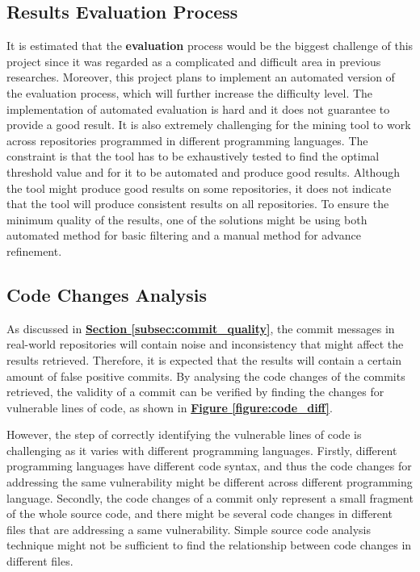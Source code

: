 \documentclass[12pt, a4paper]{report}
\begin{document}
\subsection{Results Evaluation Process}
It is estimated that the \textbf{evaluation} process would be the biggest challenge of this project
since it was regarded as a complicated and difficult area in previous researches. Moreover, this
project plans to implement an automated version of the evaluation process, which will further
increase the difficulty level. The implementation of automated evaluation is hard and it does not
guarantee to provide a good result. It is also extremely challenging for the mining tool to work
across repositories programmed in different programming languages. The constraint is that the tool
has to be exhaustively tested to find the optimal threshold value and for it to be automated and
produce good results. Although the tool might produce good results on some repositories, it does not
indicate that the tool will produce consistent results on all repositories. To ensure the minimum
quality of the results, one of the solutions might be using both automated method for basic
filtering and a manual method for advance refinement.

\subsection{Code Changes Analysis}
As discussed in \hyperref[subsec:commit_quality]{\textbf{Section \ref*{subsec:commit_quality}}}, the
commit messages in real-world repositories will contain noise and inconsistency that might affect
the results retrieved. Therefore, it is expected that the results will contain a certain amount of
false positive commits. By analysing the code changes of the commits retrieved, the validity of a
commit can be verified by finding the changes for vulnerable lines of code, as shown in
\hyperref[figure:code_diff]{\textbf{Figure \ref*{figure:code_diff}}}.

However, the step of correctly identifying the vulnerable lines of code is challenging as it varies
with different programming languages. Firstly, different programming languages have different code
syntax, and thus the code changes for addressing the same vulnerability might be different across
different programming language. Secondly, the code changes of a commit only represent a small
fragment of the whole source code, and there might be several code changes in different files that
are addressing a same vulnerability. Simple source code analysis technique might not be sufficient
to find the relationship between code changes in different files.
\end{document}
